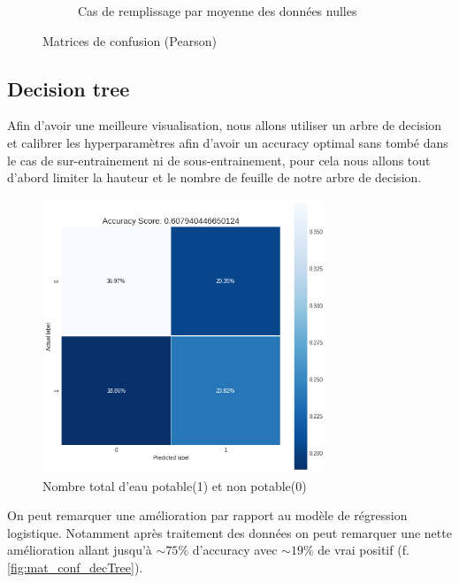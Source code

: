 \documentclass[12pt, a4paper]{article}
\begin{document}
\begin{figure}[H]
\begin{subfigure}[b]{6.75cm}
           \caption{Cas de remplissage par moyenne des données nulles}
            \label{fig:corr_matrix_mean}
     \end{subfigure}
    \caption{Matrices de confusion (Pearson)}
    \label{fig:mat_conf_reglog}
    \end{figure}
    
    \subsection{Decision tree}
    Afin d'avoir une meilleure visualisation, nous allons utiliser un arbre de decision et calibrer les hyperparamètres afin d'avoir un accuracy optimal sans tombé dans le cas de sur-entrainement ni de sous-entrainement, pour cela nous allons tout d'abord limiter la hauteur et le nombre de feuille de notre arbre de decision.
    \begin{figure}[H]
           \centering
           \includegraphics[width=8.5cm]{images/confusion_matrix_decTree_case0.png}
           \caption{Nombre total d'eau potable(1) et non potable(0)}
            \label{fig:dectree_0}
        \end{figure}
    
    On peut remarquer une amélioration par rapport au modèle de régression logistique. Notamment après traitement des données on peut remarquer une nette amélioration allant jusqu'à $\sim 75\%$ d'accuracy avec $\sim 19\%$ de vrai positif (f. \ref{fig:mat_conf_decTree}).
    
\end{document}
